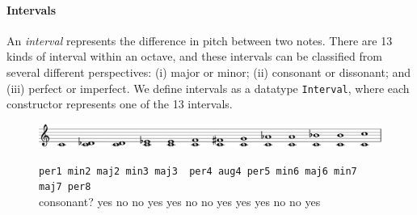 
\paragraph{Intervals}

An \emph{interval} represents the difference in pitch between
two notes.
There are 13 kinds of interval within an octave, and these
intervals can be classified from several different perspectives:
(i) major or minor; (ii) consonant or dissonant; and (iii) perfect
or imperfect.
We define intervals as a datatype \texttt{Interval}, where each
constructor represents one of the 13 intervals.

\begin{figure}[h]
  \includegraphics[width=12cm]{fig/interval.png} \\
  \begin{flushleft}
    \begin{footnotesize}
      \hspace{1.45cm} \texttt{per1 \hspace{0.5mm} min2  \hspace{2.5mm}
        maj2 \hspace{1.2mm} min3 \hspace{0.5mm} maj3 \ per4
        \hspace{1mm}aug4
        \hspace{0.5mm}  per5\hspace{1.2mm}  min6\hspace{1.6mm} maj6
        \hspace{1.6mm}min7\hspace{1.2mm} maj7\hspace{1.2mm} per8} \\
      consonant? \hspace{1.5mm} yes \hspace{4.2mm} no \hspace{6.5mm}  no
      \hspace{4.7mm} yes \hspace{3.8mm}  yes \hspace{3.7mm} no \hspace{3.5mm}
      no \hspace{4.3mm} yes \hspace{3.8mm} yes \hspace{3.2mm} yes
      \hspace{3.7mm} no \hspace{4mm} no \hspace{3.8mm} yes
    \end{footnotesize}
  \end{flushleft}
\end{figure}
